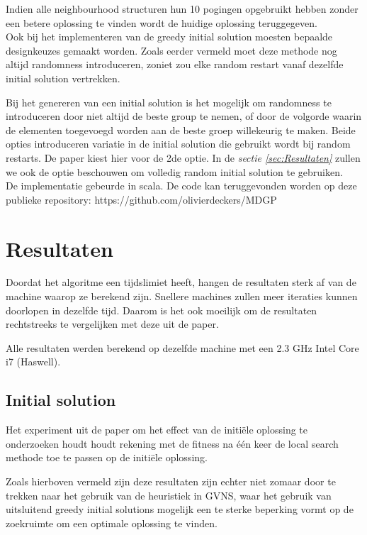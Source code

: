 \documentclass[pdftex,12pt,a4paper]{article}
\begin{document}
Indien alle neighbourhood structuren hun 10 pogingen opgebruikt hebben zonder een betere oplossing te vinden wordt de huidige oplossing teruggegeven.
\\[1em]
Ook bij het implementeren van de greedy initial solution moesten bepaalde designkeuzes gemaakt worden. Zoals eerder vermeld moet deze methode nog altijd randomness introduceren, zoniet zou elke random restart vanaf dezelfde initial solution vertrekken.
 
Bij het genereren van een initial solution is het mogelijk om randomness te introduceren door niet altijd de beste group te nemen, of door de volgorde waarin de elementen toegevoegd worden aan de beste groep willekeurig te maken. Beide opties introduceren variatie in de initial solution die gebruikt wordt bij random restarts. De paper kiest hier voor de 2de optie. In de \emph{sectie \ref{sec:Resultaten}} zullen we ook de optie beschouwen om volledig random initial solution te gebruiken.
\\[1em]
De implementatie gebeurde in scala. De code kan teruggevonden worden op deze publieke repository: https://github.com/olivierdeckers/MDGP

 
\section{Resultaten \label{sec:Resultaten}}
Doordat het algoritme een tijdslimiet heeft, hangen de resultaten sterk af van de machine waarop ze berekend zijn. Snellere machines zullen meer iteraties kunnen doorlopen in dezelfde tijd. Daarom is het ook moeilijk om de resultaten rechtstreeks te vergelijken met deze uit de paper.

Alle resultaten werden berekend op dezelfde machine met een 2.3 GHz Intel Core i7 (Haswell).


\subsection{Initial solution}
Het experiment uit de paper om het effect van de initi\"ele oplossing te onderzoeken houdt houdt rekening met de fitness na \'e\'en keer de local search methode toe te passen op de initi\"ele oplossing.

Zoals hierboven vermeld zijn deze resultaten zijn echter niet zomaar door te trekken naar het gebruik van de heuristiek in GVNS, waar het gebruik van uitsluitend greedy initial solutions mogelijk een te sterke beperking vormt op de zoekruimte om een optimale oplossing te vinden.
\end{document}
